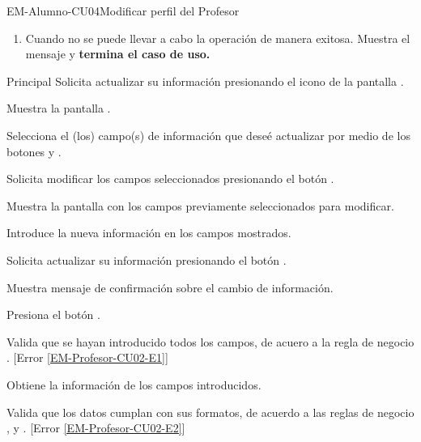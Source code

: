 \begin{UseCase}{EM-Alumno-CU04}{Modificar perfil del Profesor}
{\begin{enumerate}
			\item \label{EM-Profesor-CU02-E3} Cuando no se puede llevar a cabo la operación de manera exitosa. Muestra el mensaje  y  \textbf{termina el caso de uso.}
		\end{enumerate}	
	}
\end{UseCase}

\begin{UCtrayectoria}{Principal}
	\UCpaso [\UCactor] Solicita actualizar su información presionando el icono  de la pantalla .

	\UCpaso Muestra la pantalla . 

	\UCpaso [\UCactor] Selecciona el (los) campo(s) de información que deseé actualizar por medio de los botones  y .

	\UCpaso [\UCactor] Solicita modificar los campos seleccionados presionando el botón . 

	\UCpaso [\UCactor] Muestra la pantalla  con los campos previamente seleccionados para modificar.  

	\UCpaso [\UCactor] Introduce la nueva información en los campos mostrados.

	\UCpaso [\UCactor] Solicita actualizar su información presionando el botón .

	\UCpaso Muestra mensaje de confirmación sobre el cambio de información.

	\UCpaso Presiona el botón .  

	\UCpaso Valida que se hayan introducido todos los campos, de acuero a la regla de negocio . [Error \ref{EM-Profesor-CU02-E1}] \label{InfoObligatoria}
	
	\UCpaso Obtiene la información de los campos introducidos.
	
	\UCpaso Valida que los datos cumplan con sus formatos, de acuerdo a las reglas de negocio ,  y . [Error \ref{EM-Profesor-CU02-E2}] \label{FotmatoCorrecto}
	

\end{UCtrayectoria}
